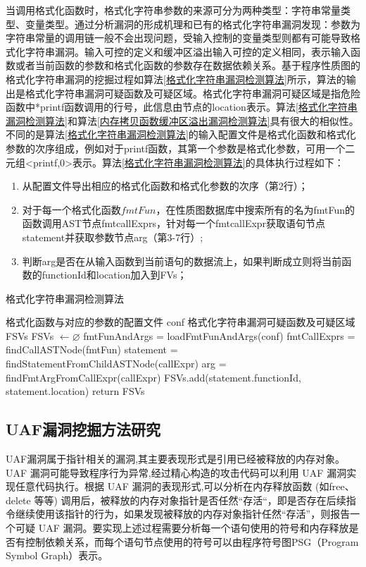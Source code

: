 {当调用格式化函数时，格式化字符串参数的来源可分为两种类型：字符串常量类型、变量类型。通过分析漏洞的形成机理和已有的格式化字符串漏洞发现：参数为字符串常量的调用链一般不会出现问题，受输入控制的变量类型则都有可能导致格式化字符串漏洞。输入可控的定义和缓冲区溢出输入可控的定义相同，表示输入函数或者当前函数的参数和格式化函数的参数存在数据依赖关系。基于程序性质图的格式化字符串漏洞的挖掘过程如算法\ref{格式化字符串漏洞检测算法}所示，算法的输出是格式化字符串漏洞可疑函数及可疑区域。格式化字符串漏洞可疑区域是指危险函数中*printf函数调用的行号，此信息由节点的location表示。算法\ref{格式化字符串漏洞检测算法}和算法\ref{内存拷贝函数缓冲区溢出漏洞检测算法}具有很大的相似性。不同的是算法\ref{格式化字符串漏洞检测算法}的输入配置文件是格式化函数和格式化参数的次序组成，例如对于printf函数，其第一个参数是格式化参数，可用一个二元组<printf,0>表示。算法\ref{格式化字符串漏洞检测算法}的具体执行过程如下：
\begin{enumerate}[(1)]
\item 从配置文件导出相应的格式化函数和格式化参数的次序（第2行）；
\item 对于每一个格式化函数$fmtFun$，在性质图数据库中搜索所有的名为fmtFun的函数调用AST节点fmtcallExprs，针对每一个fmtcallExpr获取语句节点statement并获取参数节点arg（第3-7行）;
\item 
判断arg是否在从输入函数到当前语句的数据流上，如果判断成立则将当前函数的functionId和location加入到FVs；
\end{enumerate}

\begin{algorithm}
	\renewcommand{\algorithmicrequire}{\textbf{Input:}}
	\renewcommand{\algorithmicensure}{\textbf{Output:}}
	\caption{格式化字符串漏洞检测算法}
	\label{格式化字符串漏洞检测算法}
	\begin{algorithmic}[1]
		\REQUIRE 格式化函数与对应的参数的配置文件 conf
		\ENSURE 格式化字符串漏洞可疑函数及可疑区域 FSVs
		\STATE FSVs $\leftarrow \varnothing$
		\STATE fmtFunAndArgs = loadFmtFunAndArgs(conf)
			\STATE fmtCallExprs = findCallASTNode(fmtFun)
				\STATE statement = findStatementFromChildASTNode(callExpr)
				\STATE arg = findFmtArgFromCallExpr(callExpr)
					\STATE FSVs.add(statement.functionId, statement.location)
				\ENDIF
			\ENDFOR
		\ENDFOR	
	\STATE return FSVs	
	\end{algorithmic}
\end{algorithm}

\subsection{UAF漏洞挖掘方法研究}
UAF漏洞属于指针相关的漏洞,其主要表现形式是引用已经被释放的内存对象。UAF 漏洞可能导致程序行为异常,经过精心构造的攻击代码可以利用 UAF 漏洞实现任意代码执行。根据 UAF 漏洞的表现形式,可以分析在内存释放函数 (如free、delete 等等) 调用后，被释放的内存对象指针是否任然“存活“，即是否存在后续指令继续使用该指针的行为，如果发现被释放的内存对象指针任然“存活”，则报告一个可疑 UAF 漏洞。要实现上述过程需要分析每一个语句使用的符号和内存释放是否有控制依赖关系，而每个语句节点使用的符号可以由程序符号图PSG（Program Symbol Graph）表示。

}
